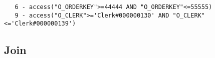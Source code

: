 \documentclass[11pt,a4paper,parskip=half]{scrartcl}
\begin{document}
\begin{lstlisting}
   6 - access("O_ORDERKEY">=44444 AND "O_ORDERKEY"<=55555)                                                                                                                                                                                                                                                   
   9 - access("O_CLERK">='Clerk#000000130' AND "O_CLERK"<='Clerk#000000139')                                                                                                                                                                                                                                 
\end{lstlisting}


\subsection{Join}
\end{document}
